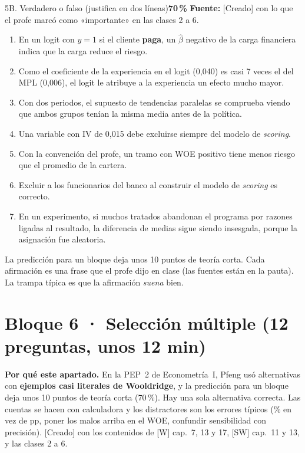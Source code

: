 \documentclass[11pt]{article}
\newcommand{\prob}[1]{\colorbox{red!15}{\textbf{#1}}}
\newcommand{\fuente}[1]{{\small\textcolor{blue!50!black}{\textbf{Fuente:} #1}}\par}
\newcommand{\bloque}[2]{\section*{Bloque #1 · #2}}
\begin{document}
\begin{ej}{5B. Verdadero o falso (justifica en dos líneas)}{\prob{70\,\%}}
\fuente{[Creado] con lo que el profe marcó como «importante» en las clases 2 a 6.}
\begin{enumerate}[label=\arabic*.,itemsep=1pt,topsep=2pt]
\item En un logit con $y=1$ si el cliente \textbf{paga}, un $\hat\beta$ negativo de la carga financiera indica que la carga reduce el riesgo.
\item Como el coeficiente de la experiencia en el logit (0,040) es casi 7 veces el del MPL (0,006), el logit le atribuye a la experiencia un efecto mucho mayor.
\item Con dos periodos, el supuesto de tendencias paralelas se comprueba viendo que ambos grupos tenían la misma media antes de la política.
\item Una variable con IV de 0,015 debe excluirse siempre del modelo de \emph{scoring}.
\item Con la convención del profe, un tramo con WOE positivo tiene menos riesgo que el promedio de la cartera.
\item Excluir a los funcionarios del banco al construir el modelo de \emph{scoring} es correcto.
\item En un experimento, si muchos tratados abandonan el programa por razones ligadas al resultado, la diferencia de medias sigue siendo insesgada, porque la asignación fue aleatoria.
\end{enumerate}
\end{ej}
\begin{porque}
La predicción para un bloque deja unos 10 puntos de teoría corta. Cada afirmación es una frase que el profe dijo en clase (las fuentes están en la pauta). La trampa típica es que la afirmación \emph{suena} bien.
\end{porque}

\bloque{6}{Selección múltiple (12 preguntas, unos 12 min)}

\begin{porque}
\textbf{Por qué este apartado.} En la PEP~2 de Econometría~I, Pfeng usó alternativas con \textbf{ejemplos casi literales de Wooldridge}, y la predicción para un bloque deja unos 10 puntos de teoría corta (70\,\%). Hay una sola alternativa correcta. Las cuentas se hacen con calculadora y los distractores son los errores típicos (\% en vez de pp, poner los malos arriba en el WOE, confundir sensibilidad con precisión). [Creado] con los contenidos de [W] cap.~7, 13 y 17, [SW] cap.~11 y 13, y las clases 2 a 6.
\end{porque}
\end{document}
